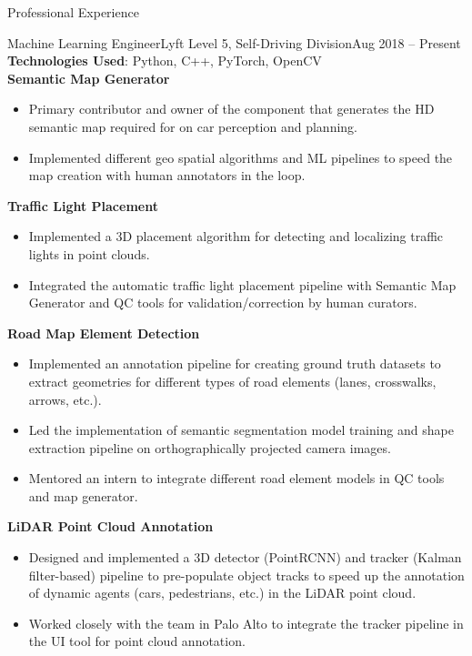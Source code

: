 \documentclass[]{mcdowellcv}
\begin{document}
	
	\begin{cvsection}{Professional Experience}
		
		\begin{cvsubsection}{Machine Learning Engineer}{Lyft Level 5, Self-Driving Division}{Aug 2018 -- Present}   
			\textit{ } \\
			\textbf{Technologies Used}: Python, C++, PyTorch, OpenCV \\
			\textbf{Semantic Map Generator}
			\begin{itemize}
				\item Primary contributor and owner of the component that generates the HD semantic map required for on car perception and planning.
				\item Implemented different geo spatial algorithms and ML pipelines to speed the map creation with human annotators in the loop.
			\end{itemize}
			
			\textbf{Traffic Light Placement}
			\begin{itemize}
				\item Implemented a 3D placement algorithm for detecting and localizing traffic lights in point clouds.
				\item Integrated the automatic traffic light placement pipeline with Semantic Map Generator and QC tools for validation/correction 
				by human curators.
			\end{itemize}
			
			\textbf{Road Map Element Detection}
			\begin{itemize}
				\item Implemented an annotation pipeline for creating ground truth datasets to extract geometries for different types of road elements (lanes, crosswalks, arrows, etc.).
				\item Led the implementation of semantic segmentation model training and shape extraction pipeline on orthographically projected camera images. 
				\item Mentored an intern to integrate different road element models in QC tools and map generator.
			\end{itemize}
			
			\textbf{LiDAR Point Cloud Annotation}
			\begin{itemize}
				\item Designed and implemented a 3D detector (PointRCNN) and tracker (Kalman filter-based) pipeline to pre-populate object tracks to speed up the annotation of dynamic agents (cars, pedestrians, etc.) in the LiDAR point cloud.
				\item Worked closely with the team in Palo Alto to integrate the tracker pipeline in the UI tool for point cloud annotation.
			\end{itemize}
			

\end{cvsubsection}
\end{cvsection}
\end{document}
